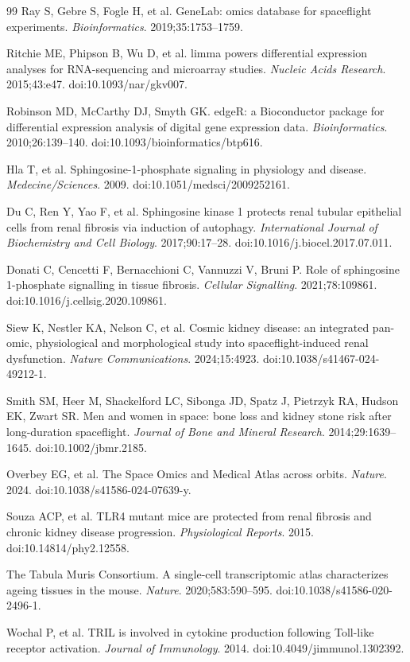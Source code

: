 \documentclass[11pt]{article}
\begin{document}
\begin{thebibliography}{99}
 Ray S, Gebre S, Fogle H, et al. GeneLab: omics database for spaceflight experiments. \emph{Bioinformatics}. 2019;35:1753--1759.

 Ritchie ME, Phipson B, Wu D, et al. limma powers differential expression analyses for RNA-sequencing and microarray studies. \emph{Nucleic Acids Research}. 2015;43:e47. doi:10.1093/nar/gkv007.

 Robinson MD, McCarthy DJ, Smyth GK. edgeR: a Bioconductor package for differential expression analysis of digital gene expression data. \emph{Bioinformatics}. 2010;26:139--140. doi:10.1093/bioinformatics/btp616.

 Hla T, et al. Sphingosine-1-phosphate signaling in physiology and disease. \emph{Medecine/Sciences}. 2009. doi:10.1051/medsci/2009252161.

 Du C, Ren Y, Yao F, et al. Sphingosine kinase 1 protects renal tubular epithelial cells from renal fibrosis via induction of autophagy. \emph{International Journal of Biochemistry and Cell Biology}. 2017;90:17--28. doi:10.1016/j.biocel.2017.07.011.

 Donati C, Cencetti F, Bernacchioni C, Vannuzzi V, Bruni P. Role of sphingosine 1-phosphate signalling in tissue fibrosis. \emph{Cellular Signalling}. 2021;78:109861. doi:10.1016/j.cellsig.2020.109861.

 Siew K, Nestler KA, Nelson C, et al. Cosmic kidney disease: an integrated pan-omic, physiological and morphological study into spaceflight-induced renal dysfunction. \emph{Nature Communications}. 2024;15:4923. doi:10.1038/s41467-024-49212-1.

 Smith SM, Heer M, Shackelford LC, Sibonga JD, Spatz J, Pietrzyk RA, Hudson EK, Zwart SR. Men and women in space: bone loss and kidney stone risk after long-duration spaceflight. \emph{Journal of Bone and Mineral Research}. 2014;29:1639--1645. doi:10.1002/jbmr.2185.

 Overbey EG, et al. The Space Omics and Medical Atlas across orbits. \emph{Nature}. 2024. doi:10.1038/s41586-024-07639-y.

 Souza ACP, et al. TLR4 mutant mice are protected from renal fibrosis and chronic kidney disease progression. \emph{Physiological Reports}. 2015. doi:10.14814/phy2.12558.

 The Tabula Muris Consortium. A single-cell transcriptomic atlas characterizes ageing tissues in the mouse. \emph{Nature}. 2020;583:590--595. doi:10.1038/s41586-020-2496-1.

 Wochal P, et al. TRIL is involved in cytokine production following Toll-like receptor activation. \emph{Journal of Immunology}. 2014. doi:10.4049/jimmunol.1302392.

\end{thebibliography}
\end{document}
